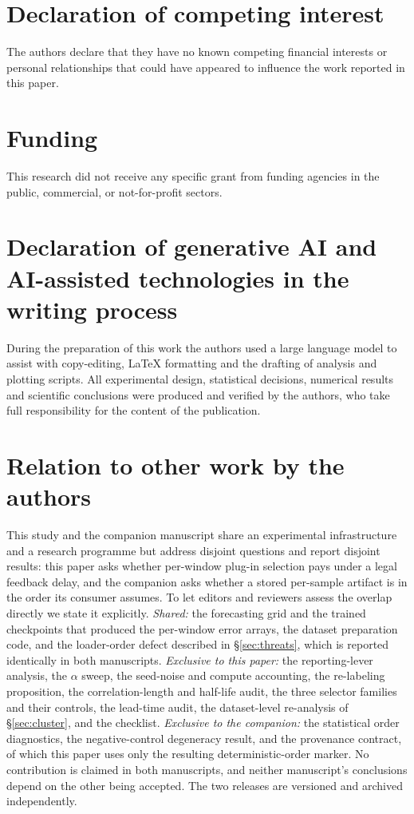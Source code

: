 \documentclass[a4paper,fleqn]{cas-sc}
\begin{document}
\printcredits

\section*{Declaration of competing interest}
The authors declare that they have no known competing financial interests or
personal relationships that could have appeared to influence the work reported in
this paper.

\section*{Funding}
This research did not receive any specific grant from funding agencies in the
public, commercial, or not-for-profit sectors.

\section*{Declaration of generative AI and AI-assisted technologies in the
writing process}
During the preparation of this work the authors used a large language model to
assist with copy-editing, LaTeX formatting and the drafting of analysis and
plotting scripts. All experimental design, statistical decisions, numerical
results and scientific conclusions were produced and verified by the authors, who
take full responsibility for the content of the publication.

\section*{Relation to other work by the authors}
This study and the companion manuscript \citep{companion2026b} share an
experimental infrastructure and a research programme but address disjoint
questions and report disjoint results: this paper asks whether per-window plug-in
selection pays under a legal feedback delay, and the companion asks
whether a stored per-sample artifact is in the order its consumer assumes. To let
editors and reviewers assess the overlap directly we state it explicitly.
\emph{Shared:} the forecasting grid and the trained checkpoints that produced the
per-window error arrays, the dataset preparation code, and the loader-order defect
described in \S\ref{sec:threats}, which is reported identically in both
manuscripts.
\emph{Exclusive to this paper:} the reporting-lever analysis, the $\alpha$ sweep,
the seed-noise and compute accounting, the re-labeling proposition, the
correlation-length and half-life audit, the three selector families and their
controls, the lead-time audit, the dataset-level re-analysis of
\S\ref{sec:cluster}, and the checklist.
\emph{Exclusive to the companion:} the statistical order diagnostics, the
negative-control degeneracy result, and the provenance contract, of which this
paper uses only the resulting deterministic-order marker.
No contribution is claimed in both manuscripts, and neither manuscript's
conclusions depend on the other being accepted. The two releases are versioned and
archived independently.
\end{document}

